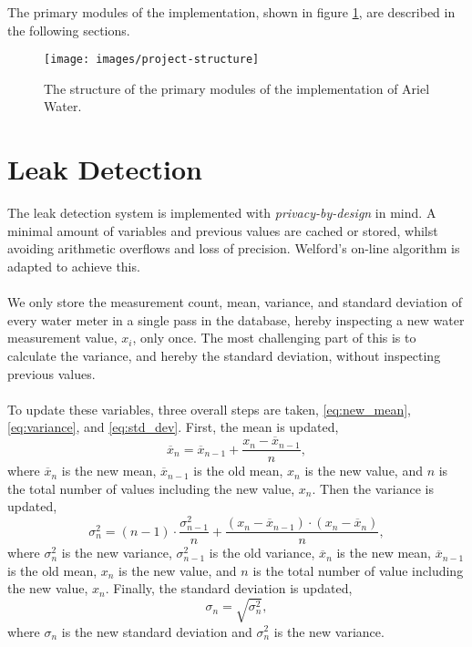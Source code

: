 The primary modules of the implementation, shown in figure \ref{fig:project-structure}, are described in the following sections.
\begin{figure}[H]\label{fig:project-structure}
	\centering
	\texttt{[image: images/project-structure]}
	\caption{The structure of the primary modules of the implementation of Ariel Water.}
\end{figure}

\section{Leak Detection}
\label{sec:dec}
The leak detection system is implemented with \textit{privacy-by-design} in mind. A minimal amount of variables and previous values are cached or stored, whilst avoiding arithmetic overflows and loss of precision. Welford's on-line algorithm is adapted to achieve this.\\\\
We only store the measurement count, mean, variance, and standard deviation of every water meter in a single pass in the database, hereby inspecting a new water measurement value, $x_i$, only once. The most challenging part of this is to calculate the variance, and hereby the standard deviation, without inspecting previous values.\\\\
To update these variables, three overall steps are taken, \ref{eq:new_mean}, \ref{eq:variance}, and \ref{eq:std_dev}. First, the mean is updated,
\[
\overline{x}_n = \overline{x}_{n-1} + \frac{x_n - \overline{x}_{n-1}}{n},
\tag{4.1}
\label{eq:new_mean}
\]
where $\overline{x}_n$ is the new mean, $\overline{x}_{n-1}$ is the old mean, $x_n$ is the new value, and $n$ is the total number of values including the new value, $x_n$. Then the variance is updated,
\[
\sigma_n^2 = (n-1) \cdot \frac{\sigma_{n-1}^2}{n} + \frac{(x_n - \overline{x}_{n-1}) \cdot (x_n - \overline{x}_{n})}{n},
\tag{4.2}
\label{eq:variance}
\]
where $\sigma_n^2$ is the new variance, $\sigma_{n-1}^2$ is the old variance, $\overline{x}_n$ is the new mean, $\overline{x}_{n-1}$ is the old mean, $x_n$ is the new value, and $n$ is the total number of value including the new value, $x_n$. Finally, the standard deviation is updated,
\[
\sigma_n = \sqrt{\sigma_n^2},
\tag{4.3}
\label{eq:std_dev}
\]
where $\sigma_n$ is the new standard deviation and $\sigma_n^2$ is the new variance.\\\\
